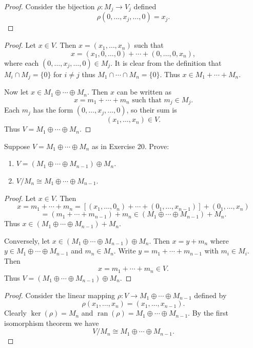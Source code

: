 \begin{proof}
    Consider the bijection $\rho : M_j \longrightarrow V_j$ defined 
    \[\rho (0, \ldots, x_j, \ldots, 0) = x_j.\]
\end{proof}

\begin{proof}
    Let $x \in V$. Then $x = (x_1,\ldots,x_n)$ such that
    \[
    x = (x_1,0,\ldots,0) + \cdots + (0,\ldots,0,x_n),
    \]
    where each $(0,\ldots,x_j,\ldots,0) \in M_j$.
    It is clear from the definition that $M_i \cap M_j = \{0\}$ for $i \ne j$ thus
    $M_1 \cap \cdots \cap M_n = \{0\}$.
    Thus $x \in M_1 + \cdots + M_n$.

    Now let $x \in M_1 \oplus \cdots \oplus M_n$. Then $x$ can be written  as
    \[
    x = m_1 + \cdots + m_n \text{ such that } m_j \in M_j.
    \]
    Each $m_j$ has the form $(0,\ldots,x_j,\ldots,0)$, so their sum is
    \[
    (x_1,\ldots,x_n) \in V.
    \]
    Thus $V = M_1 \oplus \cdots \oplus M_n$.
\end{proof}


\begin{tcolorbox}[title=Problem 22, breakable]
    Suppose $V = M_1 \oplus \cdots \oplus M_n$ as in Exercise 20.
    Prove:
    \begin{enumerate}
        \item $V = (M_1 \oplus \cdots \oplus M_{n - 1}) \oplus M_n$.
        \item $V / M_n \cong M_1 \oplus \cdots \oplus M_{n - 1}$.
    \end{enumerate}
\end{tcolorbox}

\begin{proof}
    Let $x \in V$.
    Then 
    \[
    x = m_1 + \cdots + m_n = [(x_1, \ldots, 0_n) + \cdots + (0_1, \ldots, x_{n - 1})] + (0_1, \ldots, x_n)
    \]
    \[
    = (m_1 + \cdots + m_{n - 1}) + m_n \in (M_1 \oplus \cdots \oplus M_{n - 1}) + M_n.
    \]
    Thus $x \in (M_1 \oplus \cdots \oplus M_{n - 1}) + M_n$.

    Conversely, let $x \in (M_1 \oplus \cdots \oplus M_{n - 1}) \oplus M_n$.
    Then $x = y + m_n$ where $y \in M_1 \oplus \cdots \oplus M_{n - 1}$ and $m_n \in M_n$.
    Write $y = m_1 + \cdots + m_{n-1}$ with $m_i \in M_i$.
    Then
    \[
    x = m_1 + \cdots + m_n \in V.
    \]
    Thus $V = (M_1 \oplus \cdots \oplus M_{n - 1}) \oplus M_n$.
\end{proof}

\begin{proof}
    Consider the linear mapping $\rho : V \longrightarrow M_1 \oplus \cdots \oplus M_{n - 1}$ defined by
    \[
    \rho(x_1, \ldots, x_n) = (x_1, \ldots, x_{n-1}).
    \]
    Clearly $\ker(\rho) = M_n$ and $\operatorname{ran}(\rho) = M_1 \oplus \cdots \oplus M_{n - 1}$.
    By the first isomorphism theorem we have
    \[
    V / M_n \cong M_1 \oplus \cdots \oplus M_{n - 1}.
    \]
\end{proof}


